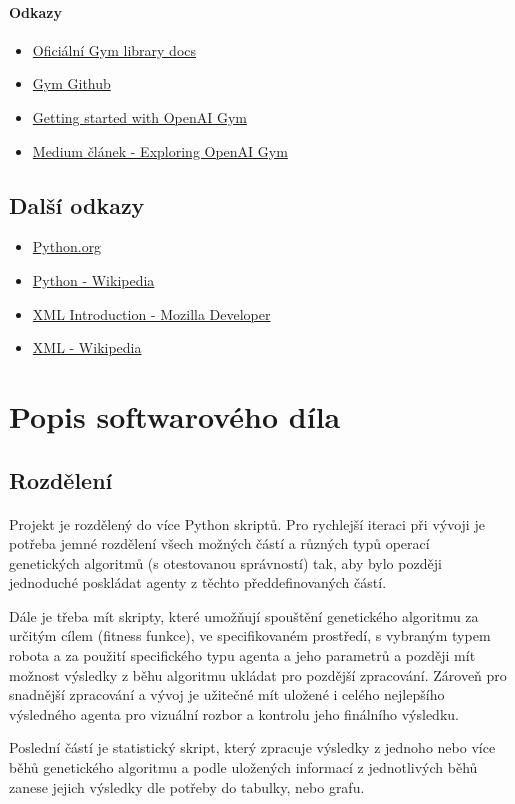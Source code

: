 \documentclass[a4paper, 12pt]{article}
\begin{document}
\paragraph{Odkazy} 
\begin{itemize}
    \item \href{https://www.gymlibrary.ml/}{Oficiální Gym library docs}
    \item \href{https://github.com/openai/gym}{Gym Github} 
    \item \href{https://blog.paperspace.com/getting-started-with-openai-gym/}{Getting started with OpenAI Gym} 
    \item \href{https://medium.com/velotio-perspectives/exploring-openai-gym-a-platform-for-reinforcement-learning-algorithms-380beef446dc}{Medium článek - Exploring OpenAI Gym}
\end{itemize}

\subsection{Další odkazy}
\begin{itemize}
    \item \href{https://www.python.org/}{Python.org}
    \item \href{https://en.wikipedia.org/wiki/Python_(programming_language)}{Python - Wikipedia} 
    \item \href{https://developer.mozilla.org/en-US/docs/Web/XML/XML_introduction}{ XML Introduction - Mozilla Developer} 
    \item \href{https://en.wikipedia.org/wiki/XML}{XML - Wikipedia}
\end{itemize}

\section{Popis softwarového díla}
\subsection{Rozdělení}
\paragraph{}Projekt je rozdělený do více Python skriptů. Pro rychlejší iteraci při vývoji
je potřeba jemné rozdělení všech možných částí a různých typů operací
\\genetických algoritmů (s otestovanou správností) tak, aby bylo později jednoduché
poskládat agenty z těchto předdefinovaných částí. 

Dále je třeba mít skripty, které umožňují spouštění genetického algoritmu za
určitým cílem (fitness funkce), ve specifikovaném prostředí, s vybraným typem
robota a za použití specifického typu agenta a jeho parametrů a později mít možnost 
výsledky z běhu algoritmu ukládat pro pozdější zpracování. Zároveň pro
snadnější zpracování a vývoj je užitečné mít uložené i celého nejlepšího výsledného 
agenta pro vizuální rozbor a kontrolu jeho finálního výsledku.

Poslední částí je statistický skript, který zpracuje výsledky z jednoho nebo
více běhů genetického algoritmu a podle uložených informací z jednotlivých běhů
zanese jejich výsledky dle potřeby do tabulky, nebo grafu.
\end{document}
